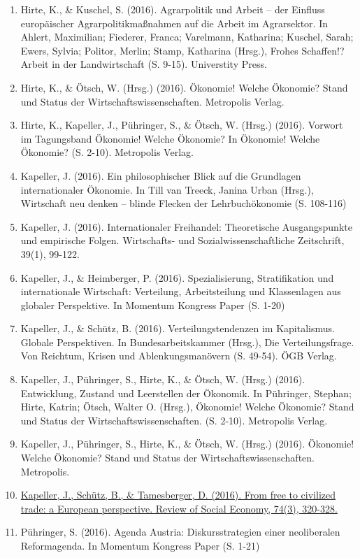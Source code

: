 \begin{enumerate}
	 \item Hirte, K., \& Kuschel, S. (2016). Agrarpolitik und Arbeit – der Einfluss europäischer Agrarpolitikmaßnahmen auf die Arbeit im Agrarsektor. In Ahlert, Maximilian; Fiederer, Franca; Varelmann, Katharina; Kuschel, Sarah; Ewers, Sylvia; Politor, Merlin; Stamp, Katharina (Hrsg.), Frohes Schaffen!? Arbeit in der Landwirtschaft (S. 9-15). Universtity Press.
	 \item Hirte, K., \& Ötsch, W. (Hrsg.) (2016). Ökonomie! Welche Ökonomie? Stand und Status der Wirtschaftswissenschaften. Metropolis Verlag.
	 \item Hirte, K., Kapeller, J., Pühringer, S., \& Ötsch, W. (Hrsg.) (2016). Vorwort im Tagungsband Ökonomie! Welche Ökonomie? In Ökonomie! Welche Ökonomie? (S. 2-10). Metropolis Verlag.
	 \item Kapeller, J. (2016). Ein philosophischer Blick auf die Grundlagen internationaler Ökonomie. In Till van Treeck, Janina Urban (Hrsg.), Wirtschaft neu denken – blinde Flecken der Lehrbuchökonomie (S. 108-116)
	 \item Kapeller, J. (2016). Internationaler Freihandel: Theoretische Ausgangspunkte und empirische Folgen. Wirtschafts- und Sozialwissenschaftliche Zeitschrift, 39(1), 99-122.
	 \item Kapeller, J., \& Heimberger, P. (2016). Spezialisierung, Stratifikation und internationale Wirtschaft: Verteilung, Arbeitsteilung und Klassenlagen aus globaler Perspektive. In Momentum Kongress Paper (S. 1-20)
	 \item Kapeller, J., \& Schütz, B. (2016). Verteilungstendenzen im Kapitalismus. Globale Perspektiven. In Bundesarbeitskammer (Hrsg.), Die Verteilungsfrage. Von Reichtum, Krisen und Ablenkungsmanövern (S. 49-54). ÖGB Verlag.
	 \item Kapeller, J., Pühringer, S., Hirte, K., \& Ötsch, W. (Hrsg.) (2016). Entwicklung, Zustand und Leerstellen der Ökonomik. In Pühringer, Stephan; Hirte, Katrin; Ötsch, Walter O. (Hrsg.), Ökonomie! Welche Ökonomie? Stand und Status der Wirtschaftswissenschaften. (S. 2-10). Metropolis Verlag.
	 \item Kapeller, J., Pühringer, S., Hirte, K., \& Ötsch, W. (Hrsg.) (2016). Ökonomie! Welche Ökonomie? Stand und Status der Wirtschaftswissenschaften. Metropolis.
	 \item \href{https://doi.org/10.1080/00346764.2016.1168033}{Kapeller, J., Schütz, B., \& Tamesberger, D. (2016). From free to civilized trade: a European perspective. Review of Social Economy, 74(3), 320-328.}
	 \item Pühringer, S. (2016). Agenda Austria: Diskursstrategien einer neoliberalen Reformagenda. In Momentum Kongress Paper (S. 1-21)

\end{enumerate}
